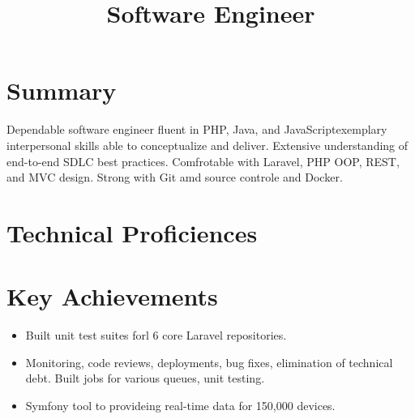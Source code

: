 \documentclass[10pt,a4paper]{moderncv}
\title{Software Engineer}
\begin{document}
\maketitle
\section{Summary}
Dependable software engineer fluent in PHP, Java, and JavaScriptexemplary interpersonal skills able to conceptualize and deliver. Extensive understanding of end-to-end SDLC best practices. Comfrotable with Laravel, PHP OOP, REST, and MVC design. Strong with Git amd source controle and Docker.
\section{Technical Proficiences}
\section{Key Achievements}
\begin{itemize}
\item Built unit test suites forl 6 core Laravel repositories.
\end{itemize}
\begin{itemize}
\item{Monitoring, code reviews, deployments, bug fixes, elimination of technical debt. Built jobs for various queues, unit testing.}
\end{itemize}
\begin{itemize}
\item{Symfony tool to provideing real-time data for 150,000 devices.}
\end{itemize}
\end{document}
